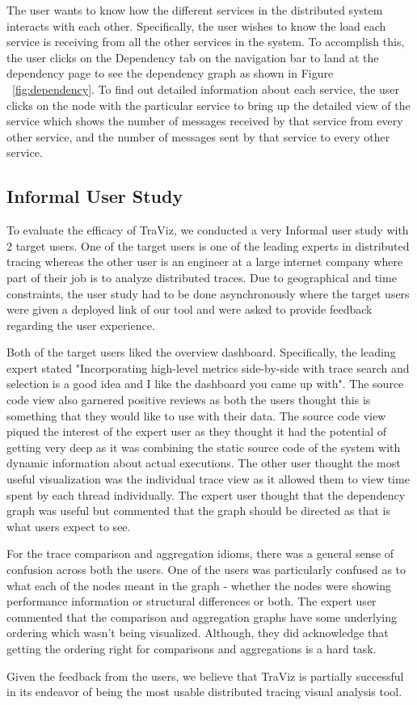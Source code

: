The user wants to know how the different services in the distributed
system interacts with each other. Specifically, the user wishes to know
the load each service is receiving from all the other services in the system.
To accomplish this, the user clicks on the Dependency tab on the navigation bar
to land at the dependency page to see the dependency graph as shown in Figure ~\ref{fig:dependency}.
To find out detailed information about each service, the user clicks on the node with
the particular service to bring up the detailed view of the service which shows
the number of messages received by that service from every other service, and the number
of messages sent by that service to every other service.

\subsection{Informal User Study}

To evaluate the efficacy of TraViz, we conducted a very Informal user study
with 2 target users. One of the target users is one of the leading experts in distributed
tracing whereas the other user is an engineer at a large internet company where part of
their job is to analyze distributed traces. Due to geographical and time constraints,
the user study had to be done asynchronously where the target users were given
a deployed link of our tool and were asked to provide feedback regarding the user
experience.

Both of the target users liked the overview dashboard. Specifically, the leading expert
stated "Incorporating high-level metrics side-by-side with trace search and selection is a good idea and I like the dashboard you came 
up with". The source code view also garnered positive reviews as both the users thought
this is something that they would like to use with their data. The source code view
piqued the interest of the expert user as they thought it had the potential of getting
very deep as it was combining the static source code of the system with dynamic information
about actual executions. The other user thought the most useful visualization was the individual
trace view as it allowed them to view time spent by each thread individually.
The expert user thought that the dependency graph was useful but commented that
the graph should be directed as that is what users expect to see.

For the trace comparison and aggregation idioms, there was a general sense of confusion
across both the users. One of the users was particularly confused as to what each
of the nodes meant in the graph - whether the nodes were showing performance information
or structural differences or both. The expert user commented that the comparison and aggregation
graphs have some underlying ordering which wasn't being visualized. Although, they did acknowledge
that getting the ordering right for comparisons and aggregations is a hard task.

Given the feedback from the users, we believe that TraViz is partially successful in its endeavor of
being the most usable distributed tracing visual analysis tool.